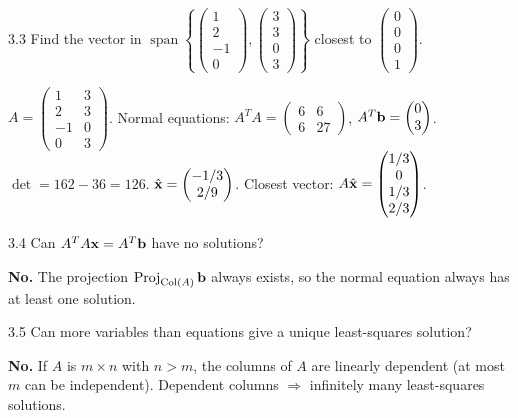 \begin{exercise}{3.3}
Find the vector in $\operatorname{span}\!\left\{\begin{pmatrix}1\\2\\-1\\0\end{pmatrix},\begin{pmatrix}3\\3\\0\\3\end{pmatrix}\right\}$ closest to $\begin{pmatrix}0\\0\\0\\1\end{pmatrix}$.
\end{exercise}
\begin{solution}
$A=\begin{pmatrix}1&3\\2&3\\-1&0\\0&3\end{pmatrix}$. Normal equations: $A^TA=\begin{pmatrix}6&6\\6&27\end{pmatrix}$, $A^T\mathbf{b}=\begin{pmatrix}0\\3\end{pmatrix}$.
$\det=162-36=126$. $\hat{\mathbf{x}}=\begin{pmatrix}-1/3\\2/9\end{pmatrix}$.
Closest vector: $A\hat{\mathbf{x}}=\begin{pmatrix}1/3\\0\\1/3\\2/3\end{pmatrix}$.
\end{solution}

\begin{exercise}{3.4}
Can $A^TA\mathbf{x}=A^T\mathbf{b}$ have no solutions?
\end{exercise}
\begin{solution}
\textbf{No.} The projection $\operatorname{Proj}_{\operatorname{Col}(A)}\mathbf{b}$ always exists, so the normal equation always has at least one solution.
\end{solution}

\begin{exercise}{3.5}
Can more variables than equations give a unique least-squares solution?
\end{exercise}
\begin{solution}
\textbf{No.} If $A$ is $m\times n$ with $n>m$, the columns of $A$ are linearly dependent (at most $m$ can be independent). Dependent columns $\Rightarrow$ infinitely many least-squares solutions.
\end{solution}

